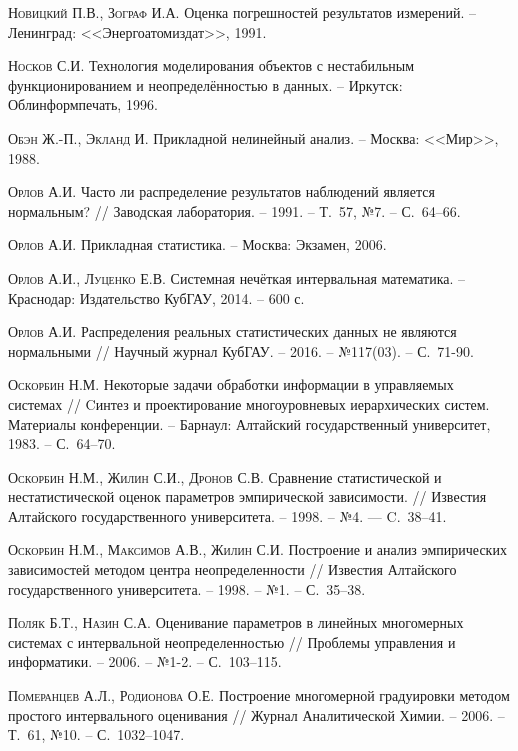 \documentclass[a5paper,openany]{book}
\begin{document}
\begin{thebibliography}{999}
\textsc{Новицкий П.В., Зограф И.А.} Оценка погрешностей результатов измерений. 
-- Ленинград: <<Энергоатомиздат>>, 1991.  
   
\textsc{Носков С.И.} Технология моделирования объектов с нестабильным функционированием 
и неопределённостью в данных. -- Иркутск: Облинформпечать, 1996. 
  
\textsc{Обэн Ж.-П., Экланд И.} Прикладной нелинейный анализ. -- Москва: <<Мир>>, 1988. 
     
\textsc{Орлов А.И.} 
Часто ли распределение результатов наблюдений является нормальным? // 
Заводская лаборатория. -- 1991. -- Т.~57, №7. -- С.~64--66. 
  
\textsc{Орлов А.И.} Прикладная статистика. -- Москва: Экзамен, 2006. 
    
\textsc{Орлов А.И., Луценко Е.В.} Системная нечёткая интервальная математика.  
-- Краснодар: Издательство КубГАУ, 2014. – 600 с. 
  
\textsc{Орлов А.И.} Распределения реальных статистических данных не являются 
нормальными // Научный журнал КубГАУ. --  2016. -- №117(03). -- С.~71-90.  
  
\textsc{Оскорбин Н.М.} Некоторые задачи обработки информации в управляемых системах // 
Cинтез и проектирование многоуровневых иерархических систем. Материалы конференции. 
-- Барнаул: Алтайский государственный университет, 1983. -- С.~64--70. 
 
\textsc{Оскорбин Н.М., Жилин С.И., Дронов С.В.} Сравнение статистической и 
нестатистической оценок параметров эмпирической зависимости. // Известия Алтайского 
государственного университета. -- 1998. -- №4. --- C.~38--41. 

\textsc{Оскорбин Н.М., Максимов А.В., Жилин С.И.} 
Построение и анализ эмпирических зависимостей методом центра неопределенности // 
Известия Алтайского государственного университета. -- 1998. -- №1. -- С.~35--38. 
  
\textsc{Поляк Б.Т., Назин С.А.} Оценивание параметров в линейных многомерных системах 
с интервальной неопределенностью // Проблемы управления и информатики. -- 2006. -- 
№1-2. -- С.~103--115.  
  
\textsc{Померанцев А.Л., Родионова О.Е.} Построение многомерной градуировки методом 
простого интервального оценивания // Журнал Аналитической Химии. -- 2006. -- Т.~61, №10. 
-- С.~1032--1047. 
  

\end{thebibliography}
\end{document}
